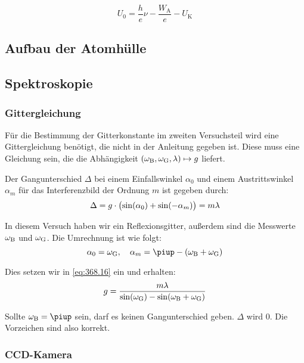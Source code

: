 \begin{equation}
    U_0 = \frac he\nu - \frac{W_\text{A}}e - U_\text{K}
    \label{eq:Energiebilanz}
\end{equation}

\subsection{Aufbau der Atomhülle}

\subsection{Spektroskopie}

\subsubsection{Gittergleichung}

Für die Bestimmung der Gitterkonstante im zweiten Versuchsteil wird eine
Gittergleichung benötigt, die nicht in der Anleitung gegeben ist. Diese muss
eine Gleichung sein, die die Abhängigkeit $(\omega_\text B, \omega_\text G,
\lambda) \mapsto g$ liefert.

Der Gangunterschied $\Delta$ bei einem Einfallswinkel $\alpha_0$ und einem
Austrittswinkel $\alpha_m$ für das Interferenzbild der Ordnung $m$ ist gegeben
durch: \cite[Formel~368.16]{physik312-Anleitung}
\begin{equation}
    \label{eq:368.16}
    \Delta = g \cdot \del{\sin(\alpha_0) + \sin(-\alpha_m)} = m \lambda
\end{equation}

In diesem Versuch haben wir ein Reflexionsgitter, außerdem sind die Messwerte
$\omega_\text B$ und $\omega_\text G$. Die Umrechnung ist wie folgt:
\[
    \alpha_0 = \omega_\text G
    \eqnsep
    \alpha_m = \piup - \del{ \omega_\text B + \omega_\text G }
\]

Dies setzen wir in \eqref{eq:368.16} ein und erhalten:
\begin{equation}
    \label{eq:gittergleichung}
    g = \frac{m \lambda}{\sin(\omega_\text G) - \sin(\omega_\text B + \omega_\text G)}
\end{equation}

Sollte $\omega_\text B = \piup$ sein, darf es keinen Gangunterschied geben.
$\Delta$ wird 0. Die Vorzeichen sind also korrekt.

\subsubsection{CCD-Kamera}

